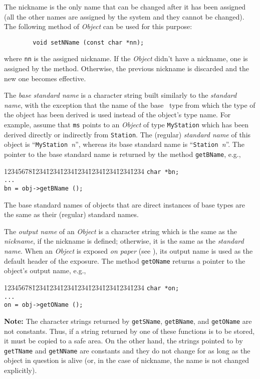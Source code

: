 The nickname is the only name that can be changed after it has been
assigned (all the other names are assigned by the system and they cannot
be changed).
The following method of {\em Object\/} can be used for this purpose:
\begin{verbatim}
        void setNName (const char *nn);
\end{verbatim}
where {\tt nn} is the assigned nickname.
If the {\em Object\/} didn't have a nickname, one is assigned by the method.
Otherwise, the previous nickname is discarded and the new one becomes
effective.

The {\em base standard name\/} is a character string
built similarly to the {\em standard name},
with the exception that the name of the base \smurph\ type from which the
type of the object has been derived is used instead of the object's
type name.
For example, assume that {\tt ms} points to an {\em Object\/} of
type {\tt MyStation} which has
been derived directly or indirectly from {\tt Station}.
The (regular) {\em standard name\/} of this object is
``{\tt MyStation~}{\em n}'',
whereas its base standard name is ``{\tt Station~}{\em n}''.
The pointer to the base standard name is returned by the method
{\tt getBName}, e.g.,
{\tt\begin{tabbing}
12345678\=1234\=1234\=1234\=1234\=1234\=1234\=1234\=1234\kill
 \> {\tt char *bn;}\\
 \> {\tt ...}\\
 \> {\tt bn = obj->getBName ();}
\end{tabbing}}
\noindent
The base standard names of objects that are direct instances of base types
are the same as their (regular) standard names.

The {\em output name\/} of an {\em Object\/} is a character string which is
the same as the {\em nickname}, if the nickname is defined; otherwise,
it is the same as the {\em standard name}.
When an {\em Object\/} is exposed {\em on paper\/} (see ),
its output name is used as the default header of the exposure.
The method {\tt getOName} returns a pointer to the object's output name,
e.g.,
{\tt\begin{tabbing}
12345678\=1234\=1234\=1234\=1234\=1234\=1234\=1234\=1234\kill
 \> {\tt char *on;}\\
 \> {\tt ...}\\
 \> {\tt on = obj->getOName ();}
\end{tabbing}}

\noindent
{\bf Note:} The character strings returned by {\tt getSName},
{\tt getBName}, and {\tt getOName} are not constants.
Thus, if a string returned by one of these functions is to be stored, it
must be copied to a safe area.
On the other hand,
the strings pointed to by {\tt getTName} and {\tt getNName} are
constants and
they do not change for as long as the object in question is alive (or,
in the case of nickname, the name is not changed explicitly).


